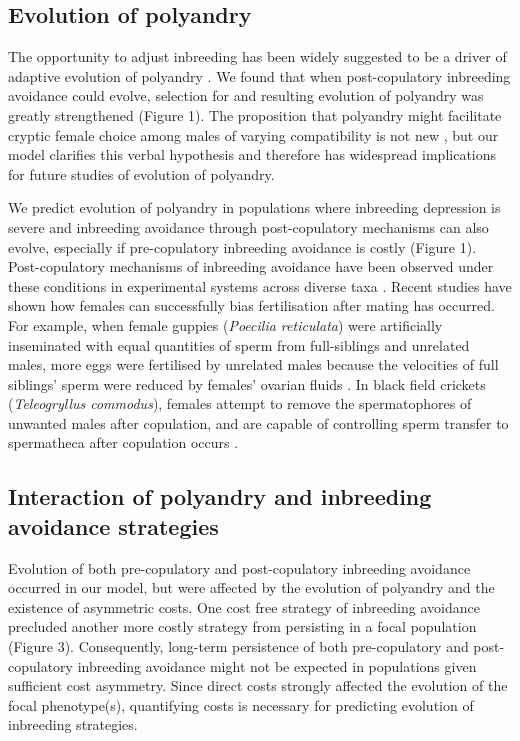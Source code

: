 \documentclass[10pt,letterpaper]{article}
\begin{document}
\subsection*{Evolution of polyandry}

The opportunity to adjust inbreeding has been widely suggested to be a driver of adaptive evolution of polyandry \cite[][]{Tregenza2002, Foerster2003, Akcay2007, Varian-Ramos2012, Kingma2013, Lehtonen2015, Reid2014}. We found that when post-copulatory inbreeding avoidance could evolve, selection for and resulting evolution of polyandry was greatly strengthened (Figure 1). The proposition that polyandry might facilitate cryptic female choice among males of varying compatibility is not new \cite[e.g.,][]{Zeh1997}, but our model clarifies this verbal hypothesis and therefore has widespread implications for future studies of evolution of polyandry. 

We predict evolution of polyandry in populations where inbreeding depression is severe and inbreeding avoidance through post-copulatory mechanisms can also evolve, especially if pre-copulatory inbreeding avoidance is costly (Figure 1). Post-copulatory mechanisms of inbreeding avoidance have been observed under these conditions in experimental systems across diverse taxa \cite[e.g.,][]{Pizzari2004, Firman2008, Bretman2009, Gasparini2011, Tuni2013, Firman2015}. Recent studies have shown how females can successfully bias fertilisation after mating has occurred. For example, when female guppies (\textit{Poecilia reticulata}) were artificially inseminated with equal quantities of sperm from full-siblings and unrelated males, more eggs were fertilised by unrelated males because the velocities of full siblings' sperm were reduced by females' ovarian fluids \cite[][]{Gasparini2011}. In black field crickets (\textit{Teleogryllus commodus}), females attempt to remove the spermatophores of unwanted males after copulation, and are capable of controlling sperm transfer to spermatheca after copulation occurs \cite[][]{Bussiere2006, Tuni2013}.


\subsection*{Interaction of polyandry and inbreeding avoidance strategies}

Evolution of both pre-copulatory and post-copulatory inbreeding avoidance occurred in our model, but were affected by the evolution of polyandry and the existence of asymmetric costs. One cost free strategy of inbreeding avoidance precluded another more costly strategy from persisting in a focal population (Figure 3). Consequently, long-term persistence of both pre-copulatory and post-copulatory inbreeding avoidance might not be expected in populations given sufficient cost asymmetry. Since direct costs strongly affected the evolution of the focal phenotype(s), quantifying costs is necessary for predicting evolution of inbreeding strategies. 
\end{document}
